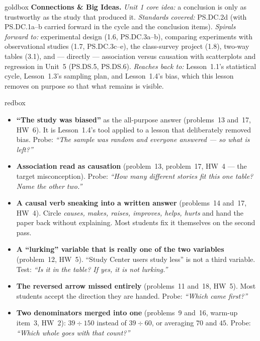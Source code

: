 \documentclass[10pt]{article}
\begin{document}
\begin{skillbox}{goldbox}
\textbf{Connections \& Big Ideas.} \textit{Unit 1 core idea:} a conclusion is only as
trustworthy as the study that produced it. \textit{Standards covered:} PS.DC.2d (with
PS.DC.1a--b carried forward in the cycle and the conclusion items). \textit{Spirals forward
to:} experimental design (1.6, PS.DC.3a--b), comparing experiments with observational studies
(1.7, PS.DC.3c--e), the class-survey project (1.8), two-way tables (3.1), and --- directly ---
association versus causation with scatterplots and regression in Unit~5 (PS.DS.5, PS.DS.6).
\textit{Reaches back to:} Lesson~1.1's statistical cycle, Lesson~1.3's sampling plan, and
Lesson~1.4's bias, which this lesson removes on purpose so that what remains is visible.
\end{skillbox}

\boxguard
\begin{skillbox}{redbox}
\begin{itemize}[leftmargin=1.2em, nosep]
  \item \textbf{``The study was biased''} as the all-purpose answer (problems~13 and~17, HW~6).
        It is Lesson~1.4's tool applied to a lesson that deliberately removed bias. Probe:
        \emph{``The sample was random and everyone answered --- so what is left?''}
  \item \textbf{Association read as causation} (problem~13, problem~17, HW~4 --- the target
        misconception). Probe: \emph{``How many different stories fit this one table? Name the
        other two.''}
  \item \textbf{A causal verb sneaking into a written answer} (problems~14 and~17, HW~4).
        Circle \emph{causes, makes, raises, improves, helps, hurts} and hand the paper back
        without explaining. Most students fix it themselves on the second pass.
  \item \textbf{A ``lurking'' variable that is really one of the two variables} (problem~12,
        HW~5). ``Study Center users study less'' is not a third variable. Test: \emph{``Is it
        in the table? If yes, it is not lurking.''}
  \item \textbf{The reversed arrow missed entirely} (problems~11 and~18, HW~5). Most students
        accept the direction they are handed. Probe: \emph{``Which came first?''}
  \item \textbf{Two denominators merged into one} (problems~9 and~16, warm-up item~3, HW~2):
        $39\div 150$ instead of $39 \div 60$, or averaging $70$ and $45$. Probe: \emph{``Which
        whole goes with that count?''}

\end{itemize}
\end{skillbox}
\end{document}
